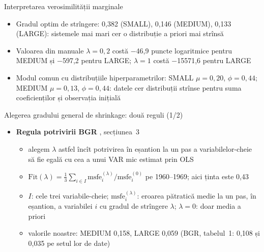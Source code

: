 \begin{frame}{Interpretarea verosimilității marginale}
\itemsize{\small}
\begin{itemize}
    \item Gradul optim de strîngere: 0{,}382 (SMALL), 0{,}146 (MEDIUM), 0{,}133 (LARGE): sistemele mai mari cer o distribuție a priori mai strînsă
    \item Valoarea din manuale $\lambda = 0{,}2$ costă \ensuremath{-}46{,}9 puncte logaritmice pentru MEDIUM și \ensuremath{-}597{,}2 pentru LARGE; $\lambda = 1$ costă \ensuremath{-}15571{,}6 pentru LARGE
    \item Modul comun cu distribuțiile hiperparametrilor: SMALL $\mu = 0{,}20$, $\phi = 0{,}44$; MEDIUM $\mu = 0{,}13$, $\phi = 0{,}44$: datele cer distribuții strînse pentru suma coeficienților și observația inițială
\end{itemize}
\end{frame}

\begin{frame}{Alegerea gradului general de shrinkage: două reguli (1/2)}
\itemsize{\small}
\begin{itemize}
    \item \textbf{Regula potrivirii BGR} , secțiunea~3
    \begin{itemize}
        \item alegem $\lambda$ astfel încît potrivirea în eșantion la un pas a variabilelor-cheie să fie egală cu cea a unui VAR mic estimat prin OLS
        \item $\mathrm{Fit}(\lambda) = \frac13\sum_{i\in I}\mathrm{msfe}_i^{(\lambda)}/\mathrm{msfe}_i^{(0)}$ pe 1960--1969; aici ținta este 0{,}43
        \item $I$: cele trei variabile-cheie; $\mathrm{msfe}_i^{(\lambda)}$: eroarea pătratică medie la un pas, în eșantion, a variabilei $i$ cu gradul de strîngere $\lambda$; $\lambda = 0$: doar media a priori
        \item valorile noastre: MEDIUM 0{,}158, LARGE 0{,}059 (BGR, tabelul~1: 0,108 și 0,035 pe setul lor de date)
    \end{itemize}
\end{itemize}
\end{frame}


